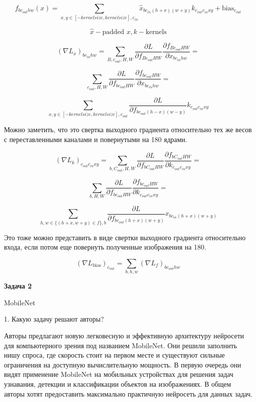 \documentclass[10pt]{article}
\begin{document}
		$$ f_{bc_{out}hw}(x) = \sum_{x,y \in [-kernel size, kernel size], c_{in}} \hat{x}_{bc_{in}(h+x)(w+y)} k_{c_{out}c_{in}xy}  + \text{bias}_{c_{out}}$$
		
		$$\hat{x} - \text{padded $x$}, k - \text{kernels}$$
		
	$$(\nabla L_x)_{bc_{in}hw} =
	\sum_{B,c_{out},H,W} \frac{\partial L}{\partial f_{Bc_{out}HW}} \frac{\partial f_{Bc_{out}HW}}{\partial x_{bc_{in}hw}}  =$$
	
	$$ \sum_{c_{out},H,W} \frac{\partial L}{\partial f_{bc_{out}HW}} \frac{\partial f_{bc_{out}HW}}{\partial x_{bc_{in}hw}} =$$

	$$ \sum_{x,y \in [-kernel size, kernel size], c_{out}} \frac{\partial L}{\partial f_{bc_{out}(h-x)(w-y)}} k_{c_{out}c_{in}xy}  $$
	
	Можно заметить, что это свертка выходного градиента относительно тех же весов с переставленными каналами и повернутыми на 180 ядрами.
	
	$$(\nabla L_k)_{c_{out}c_{in}xy} =	\sum_{b,C_{out},H,W} \frac{\partial L}{\partial f_{bC_{out}HW}} \frac{\partial f_{bC_{out}HW}}{\partial k_{c_{out}c_{in}xy}}   =$$
	
	$$\sum_{b,H,W} \frac{\partial L}{\partial f_{bc_{out}HW}} \frac{\partial f_{bc_{out}HW}}{\partial k_{c_{out}c_{in}xy}}  =$$
		
	$$\sum_{h,w \in \{ (h+x, w+y) \in f \},b} \frac{\partial L}{\partial f_{bc_{out}(h+x)(w+y)}} x_{bc_{in}(h+x)(w+y)} $$
	
	Это тоже можно представить в виде свертки выходного градиента относительно входа, если потом еще повернуть полученные изображения на 180.
	
	$$(\nabla L_{\text{bias}})_{c_{out}} = \sum_{b,h,w} (\nabla L_f)_{bc_{out}hw}$$
	\bigskip
	
	\textbf{Задача 2}
	
	\medskip
	MobileNet
	\medskip
	
	1. Какую задачу решают авторы?
	\medskip
	
	Авторы предлагают новую легковесную и эффективную архитектуру нейросети для компьютерного зрения под названием MobileNet. Они решили заполнить нишу спроса, где скорость стоит на первом месте и существуют сильные ограничения на доступную вычислительную мощность. В первую очередь они видят применение MobileNet на мобильных устройствах для решения задач узнавания, детекции и классификации объектов на изображениях. В общем авторы хотят предоставить максимально практичную нейросеть для данных задач.
	
\end{document}
